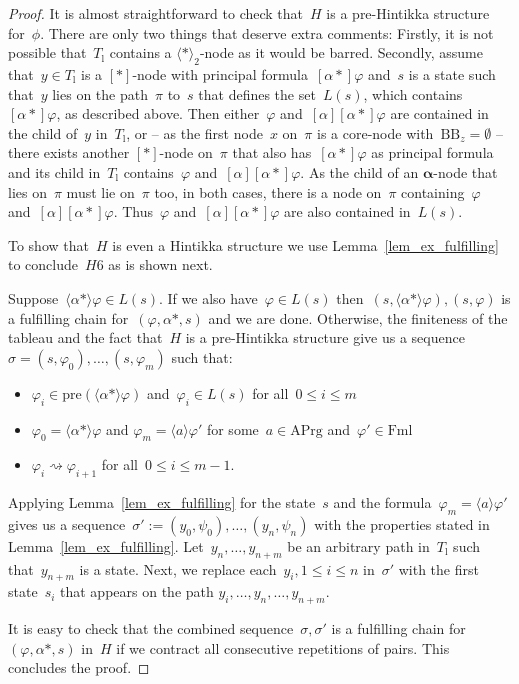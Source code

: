 \documentclass{entcs}
\newcommand{\pea}[2]{\langle#1\rangle #2}
\newcommand{\paa}[2]{[#1] #2}
\newcommand{\prp}[1]{#1*}
\newcommand{\fml}{\mathrm{Fml}}
\newcommand{\act}{\mathrm{APrg}}
\newcommand{\ppre}[1]{\mathrm{pre}(#1)}
\newcommand{\pzz}{\mathrel{\rightsquigarrow}}
\newcommand{\tbbox}{\mathrm{BB}}
\newcommand{\talpha}{\boldsymbol{\alpha}}
\newcommand{\trar}{$\paa{\prp{}}{}$}
\newcommand{\trert}{$\pea{\prp{}}{}_2$}
\newcommand{\tl}{T_{\mathrm{l}}}
\newcommand{\fchn}{\sigma}
\begin{document}
\begin{proof}
  It is almost straightforward to check that~$H$ is a pre-Hintikka structure for~$\phi$.
  There are only two things that deserve extra comments:
  Firstly, it is not possible
  that~$\tl$ contains a \trert{}-node as it would be barred.
  Secondly, assume that~$y \in \tl$ is a \trar{}-node with principal formula~$\paa{\prp{\alpha}}{\varphi}$
  and~$s$ is a state such that~$y$ lies on the path~$\pi$ to~$s$
  that defines the set~$L(s)$, which contains~$\paa{\prp{\alpha}}{\varphi}$, as described above.
  Then either~$\varphi$ and~$\paa{\alpha}{\paa{\prp{\alpha}}{\varphi}}$ are contained in the child of~$y$ in~$\tl$,
  or -- as the first node~$x$ on~$\pi$ is a core-node with~$\tbbox_z = \emptyset$ --
  there exists another \trar{}-node on~$\pi$
  that also has~$\paa{\prp{\alpha}}{\varphi}$ as principal formula 
  and its child in~$\tl$ contains~$\varphi$ and~$\paa{\alpha}{\paa{\prp{\alpha}}{\varphi}}$.
  As the child of an $\talpha$-node that lies on~$\pi$ must lie on~$\pi$ too,
  in both cases, there is a node on~$\pi$ containing~$\varphi$ and~$\paa{\alpha}{\paa{\prp{\alpha}}{\varphi}}$.
  Thus~$\varphi$ and~$\paa{\alpha}{\paa{\prp{\alpha}}{\varphi}}$ are also contained in~$L(s)$.

  To show that~$H$ is even a Hintikka structure
  we use Lemma~\ref{lem_ex_fulfilling} to conclude~$H6$ as is shown next.

  Suppose~$\pea{\prp{\alpha}}{\varphi} \in L(s)$.
  If we also have~$\varphi \in L(s)$
  then~$(s, \pea{\prp{\alpha}}{\varphi}), (s, \varphi)$ is a fulfilling chain for~$(\varphi, \prp{\alpha}, s)$
  and we are done.
  Otherwise,
  the finiteness of the tableau
  and the fact that~$H$ is a pre-Hintikka structure
  give us a sequence~$\fchn = (s, \varphi_0), \dotsc, (s, \varphi_m)$
  such that:
  \begin{itemize}
  \item $\varphi_i \in \ppre{\pea{\prp{\alpha}}{\varphi}}$ and~$\varphi_i \in L(s)$ for all~$0 \leq i \leq m$
  \item $\varphi_0 = \pea{\prp{\alpha}}{\varphi}$ and $\varphi_m = \pea{a}{\varphi'}$ for some~$a \in \act$ and~$\varphi' \in \fml$
  \item $\varphi_i \pzz \varphi_{i+1}$ for all~$0 \leq i \leq m-1$.
  \end{itemize}
  Applying Lemma~\ref{lem_ex_fulfilling} for the state~$s$ and the formula~$\varphi_m = \pea{a}{\varphi'}$
  gives us a sequence~$\fchn' := (y_0, \psi_0), \dotsc, (y_n, \psi_n)$
  with the properties stated in Lemma~\ref{lem_ex_fulfilling}.
  Let~$y_n, \dotsc, y_{n+m}$ be an arbitrary path in~$\tl$ such that~$y_{n+m}$ is a state.
  Next, we replace each~$y_i, 1 \leq i \leq n$ in~$\fchn'$ with the first state~$s_i$
  that appears on the path $y_i, \dotsc, y_n, \dotsc, y_{n+m}$.

  It is easy to check that the combined sequence~$\fchn, \fchn'$
  is a fulfilling chain for~$(\varphi, \prp{\alpha}, s)$ in~$H$
  if we contract all consecutive repetitions of pairs.
  This concludes the proof.
\end{proof}
\end{document}
